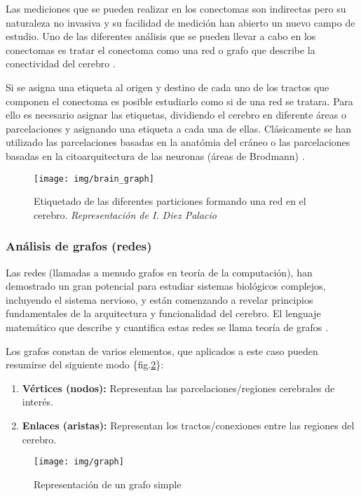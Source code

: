 \documentclass[fleqn,12pt]{UICArticle} %
\begin{document}
Las mediciones que se pueden realizar en los conectomas son indirectas pero su naturaleza no invasiva y su facilidad de medición han abierto un nuevo campo de estudio. Uno de las diferentes análisis que se pueden llevar a cabo en los conectomas es tratar el conectoma como una red o grafo que describe la conectividad del cerebro \cite{Fornito, Bullmore2009}.

Si se asigna una etiqueta al origen y destino de cada uno de los tractos que componen el conectoma es posible estudiarlo como si de una red se tratara. Para ello es necesario asignar las etiquetas, dividiendo el cerebro  en diferente áreas o parcelaciones y asignando una etiqueta a cada una de ellas. Clásicamente se han utilizado las parcelaciones basadas en la anatómia del cráneo o las parcelaciones basadas en la citoarquitectura de las neuronas (áreas de Brodmann) \cite{Destrieux2010}.

\begin{figure}[h]
	\centering
	\texttt{[image: img/brain\_graph]}
	\caption{Etiquetado de las diferentes particiones formando una red en el cerebro. \textit{Representación de I. Diez Palacio}}
	\label{fig:brein_graph}
\end{figure}

\subsubsection{Análisis de grafos (redes)}

Las redes (llamadas a menudo grafos en teoría de la computación), han demostrado un gran potencial para estudiar sistemas biológicos complejos, incluyendo el sistema nervioso, y están comenzando a revelar principios fundamentales de la arquitectura y funcionalidad del cerebro. El lenguaje matemático que describe y cuantifica estas redes se llama teoría de grafos \cite{Mori2002}. 
 
Los grafos constan de varios elementos, que aplicados a este caso pueden resumirse del siguiente modo  \{fig.\ref{fig:graph}\}:
\begin{enumerate}[noitemsep]
\item \textbf{Vértices (nodos):} Representan las parcelaciones/regiones cerebrales de interés.
\item \textbf{Enlaces (aristas):} Representan los tractos/conexiones entre las regiones del cerebro.
\end{enumerate}

\begin{figure}[h]
	\centering
	\texttt{[image: img/graph]}
	\vspace{5mm} 
	\caption{Representación de un grafo simple}
	\label{fig:graph}
\end{figure}
\end{document}
